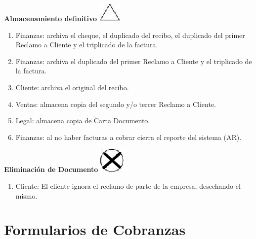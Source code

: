 \begin{center}
  \textbf{Almacenamiento definitivo}
  \includegraphics{./Images/Simbolos/simbolo-Almacenamiento-Definitivo.png}
\end{center}
\begin{enumerate}
\item Finanzas: archiva el cheque, el duplicado del recibo, el duplicado del primer Reclamo a Cliente y el triplicado de la factura.
\item Finanzas: archiva el duplicado del primer Reclamo a Cliente y el triplicado de la factura.
\item Cliente: archiva el original del recibo.
\item Ventas: almacena copia del segundo y/o tercer Reclamo a Cliente.
\item Legal: almacena copia de Carta Documento.
\item Finanzas: al no haber facturas a cobrar cierra el reporte del sistema (AR).
\end{enumerate}


\begin{center}
  \textbf{Eliminación de Documento}
  \includegraphics{./Images/Simbolos/simbolo-destruccion.png}
\end{center}
\begin{enumerate}
\item Cliente: El cliente ignora el reclamo de parte de la empresa, desechando el mismo.
\end{enumerate}


\pagebreak
\section{Formularios de Cobranzas}

